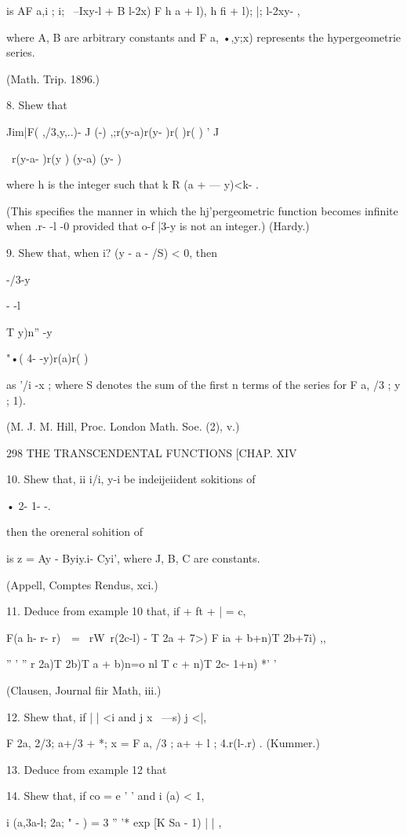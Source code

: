 is AF a,i ; i; \ --Ixy-l + B l-2x) F h a + l), h fi + l); |; l-2xy- ,

where A, B are arbitrary constants and F a, •,y;x) represents the
hypergeometrie series.

(Math. Trip. 1896.)

8. Shew that

Jim|F( ,/3,y,..)- J (-) ,;r(y-a)r(y- )r( )r( ) ' J

\ r(y-a- )r(y ) (y-a) (y- )

where h is the integer such that k R (a + — y)<k- .

(This specifies the manner in which the hj'pergeometric function
becomes infinite when .r- -l -0 provided that o-f |3-y is not an
integer.) (Hardy.)

9. Shew that, when i? (y - a - /S) < 0, then

-/3-y

- -l

T y)n'' -y

 "•( 4- -y)r(a)r( )

as '/i -x ; where S denotes the sum of the first n terms of the series
for F a, /3 ; y ; 1).

(M. J. M. Hill, Proc. London Math. Soe. (2), v.)

298 THE TRANSCENDENTAL FUNCTIONS [CHAP. XIV

10. Shew that, ii i/i, y-i be indeijeiident sokitions of

• 2- 1- -.

then the oreneral sohition of

is z = Ay - Byiy.i- Cyi', where J, B, C are constants.

(Appell, Comptes Rendus, xci.)

11. Deduce from example 10 that, if + ft + | = c,

 F(a h- r- r)\ \ = \ rW\ r(2c-l) - T 2a + 7>) F ia + b+n)T 2b+7i) ,,

'' ' '' r 2a)T 2b)T a + b)n=o nl T c + n)T 2c- 1+n) *' '

(Clausen, Journal fiir Math, iii.)

12. Shew that, if | | <i and j x \ —s) j <|,

F 2a, 2/3; a+/3 + *; x = F a, /3 ; a+ + l ; 4.r(l-.r) . (Kummer.)

13. Deduce from example 12 that

14. Shew that, if co = e ' ' and i (a) < 1,

i (a,3a-l; 2a; " - ) = 3 '' '* exp [K Sa - 1) | | ,

